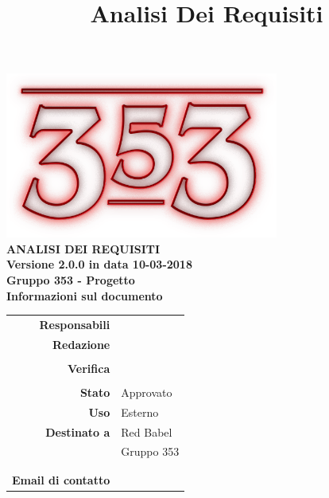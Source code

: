 \documentclass[openany, a4paper, 12pt]{report}
\title{Analisi Dei Requisiti}
\begin{document}
\begin{titlepage}
	\centering
	\vfill
	{
		\bfseries
		\vskip2cm
		\includegraphics[width=9cm]{../../common/images/logo.png} \\
		\vfill
		\Huge{ANALISI DEI REQUISITI}\\
		\vfill
		\Large Versione 2.0.0 in data 10-03-2018\\
		\large Gruppo 353 - Progetto \progetto \\
		\vfill
\normalsize Informazioni sul documento\\

\begin{table}[htbp]
	\centering
	\renewcommand\arraystretch{1.2}
	\begin{tabular}{r|l}
		\hline
		\textbf{Responsabili}	& \Riccardo \\
								
		
		\textbf{Redazione} 		& \Davide\\
								& \Valentina\\
		
		\textbf{Verifica} 		& \Elena\\
								& \Parwinder\\
						
		\textbf{Stato} 			& Approvato\\
		\textbf{Uso}			& Esterno\\
		\textbf{Destinato a}   	& Red Babel\\
								& Gruppo 353\\
								& \Vardanega\\
								& \Cardin\\
		
						
			\textbf{Email di contatto}	& \mailgroup
	\end{tabular}
\end{table}
		\vfill
	}    
\end{titlepage}

\tableofcontents
\listoffigures

\listoftables

\newpage
{}




 
\end{document}
